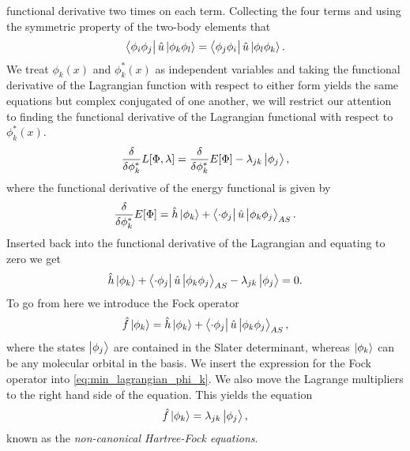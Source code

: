             functional derivative two times on each term. Collecting the four terms
            and using the symmetric property of the two-body elements that
            \begin{align}
                \bra{\phi_i\phi_j}\hat{u}\ket{\phi_k\phi_l}
                = \bra{\phi_j\phi_i}\hat{u}\ket{\phi_l\phi_k}.
            \end{align}
            We treat $\phi_k(x)$ and $\phi_k^{*}(x)$ as independent
            variables and taking the functional derivative of the Lagrangian
            function with respect to either form yields the same equations but
            complex conjugated of one another, we will restrict our attention to
            finding the functional derivative of the Lagrangian functional with
            respect to $\phi_k^{*}(x)$.
            \begin{align}
                \frac{\delta }{\delta \phi_k^{*}}L[\Phi, \lambda]
                = \frac{\delta }{\delta \phi_k^{*}}E[\Phi]
                - \lambda_{jk}\ket{\phi_{j}},
            \end{align}
            where the functional derivative of the energy functional is given by
            \begin{align}
                \frac{\delta }{\delta \phi_k^{*}}E[\Phi]
                = \hat{h}\ket{\phi_k}
                + \bra{\cdot\phi_j}\hat{u}\ket{\phi_k\phi_j}_{AS}.
            \end{align}
            Inserted back into the functional derivative of the Lagrangian and
            equating to zero we get
            \begin{gather}
                \hat{h}\ket{\phi_k}
                + \bra{\cdot\phi_j}\hat{u}\ket{\phi_k\phi_j}_{AS}
                - \lambda_{jk}\ket{\phi_{j}} = 0.
                \label{eq:min_lagrangian_phi_k}
            \end{gather}
            To go from here we introduce the Fock operator
            \begin{align}
                \hat{f}\ket{\phi_k}
                = \hat{h}\ket{\phi_k}
                + \bra{\cdot\phi_j}\hat{u}\ket{\phi_k\phi_j}_{AS},
            \end{align}
            where the states $\ket{\phi_j}$ are contained in the Slater determinant,
            whereas $\ket{\phi_k}$ can be any molecular orbital in the basis.
            We insert the expression for the Fock operator into
            \autoref{eq:min_lagrangian_phi_k}.
            We also move the Lagrange multipliers to the right hand side of the
            equation.
            This yields the equation
            \begin{align}
                \hat{f}\ket{\phi_k} = \lambda_{jk}\ket{\phi_j},
                \label{eq:non-canonical-hartree-fock}
            \end{align}
            known as the \emph{non-canonical Hartree-Fock equations}.

